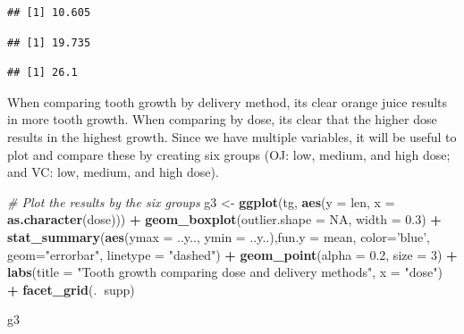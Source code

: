 \documentclass[]{article}
\newenvironment{Shaded}{\begin{snugshade}}{\end{snugshade}}
\newcommand{\CommentTok}[1]{\textcolor[rgb]{0.56,0.35,0.01}{\textit{#1}}}
\newcommand{\DataTypeTok}[1]{\textcolor[rgb]{0.13,0.29,0.53}{#1}}
\newcommand{\DecValTok}[1]{\textcolor[rgb]{0.00,0.00,0.81}{#1}}
\newcommand{\FloatTok}[1]{\textcolor[rgb]{0.00,0.00,0.81}{#1}}
\newcommand{\KeywordTok}[1]{\textcolor[rgb]{0.13,0.29,0.53}{\textbf{#1}}}
\newcommand{\NormalTok}[1]{#1}
\newcommand{\OperatorTok}[1]{\textcolor[rgb]{0.81,0.36,0.00}{\textbf{#1}}}
\newcommand{\OtherTok}[1]{\textcolor[rgb]{0.56,0.35,0.01}{#1}}
\newcommand{\StringTok}[1]{\textcolor[rgb]{0.31,0.60,0.02}{#1}}
\begin{document}
\begin{verbatim}
## [1] 10.605
\end{verbatim}

\begin{verbatim}
## [1] 19.735
\end{verbatim}

\begin{verbatim}
## [1] 26.1
\end{verbatim}

When comparing tooth growth by delivery method, its clear orange juice
results in more tooth growth. When comparing by dose, its clear that the
higher dose results in the highest growth. Since we have multiple
variables, it will be useful to plot and compare these by creating six
groups (OJ: low, medium, and high dose; and VC: low, medium, and high
dose).

\begin{Shaded}
\begin{Highlighting}[]
\CommentTok{# Plot the results by the six groups}
\NormalTok{g3 <-}\StringTok{ }\KeywordTok{ggplot}\NormalTok{(tg, }\KeywordTok{aes}\NormalTok{(}\DataTypeTok{y =}\NormalTok{ len, }\DataTypeTok{x =} \KeywordTok{as.character}\NormalTok{(dose))) }\OperatorTok{+}
\StringTok{    }\KeywordTok{geom_boxplot}\NormalTok{(}\DataTypeTok{outlier.shape =} \OtherTok{NA}\NormalTok{, }\DataTypeTok{width =} \FloatTok{0.3}\NormalTok{) }\OperatorTok{+}
\StringTok{    }\KeywordTok{stat_summary}\NormalTok{(}\KeywordTok{aes}\NormalTok{(}\DataTypeTok{ymax =}\NormalTok{ ..y.., }\DataTypeTok{ymin =}\NormalTok{ ..y..),}\DataTypeTok{fun.y =}\NormalTok{ mean, }\DataTypeTok{color=}\StringTok{'blue'}\NormalTok{, }\DataTypeTok{geom=}\StringTok{"errorbar"}\NormalTok{, }\DataTypeTok{linetype =} \StringTok{"dashed"}\NormalTok{) }\OperatorTok{+}\StringTok{ }
\StringTok{    }\KeywordTok{geom_point}\NormalTok{(}\DataTypeTok{alpha =} \FloatTok{0.2}\NormalTok{, }\DataTypeTok{size =} \DecValTok{3}\NormalTok{) }\OperatorTok{+}
\StringTok{    }\KeywordTok{labs}\NormalTok{(}\DataTypeTok{title =} \StringTok{"Tooth growth comparing dose and delivery methods"}\NormalTok{, }\DataTypeTok{x =} \StringTok{"dose"}\NormalTok{) }\OperatorTok{+}
\StringTok{    }\KeywordTok{facet_grid}\NormalTok{(.}\OperatorTok{~}\NormalTok{supp)}

\NormalTok{g3}
\end{Highlighting}
\end{Shaded}
\end{document}
